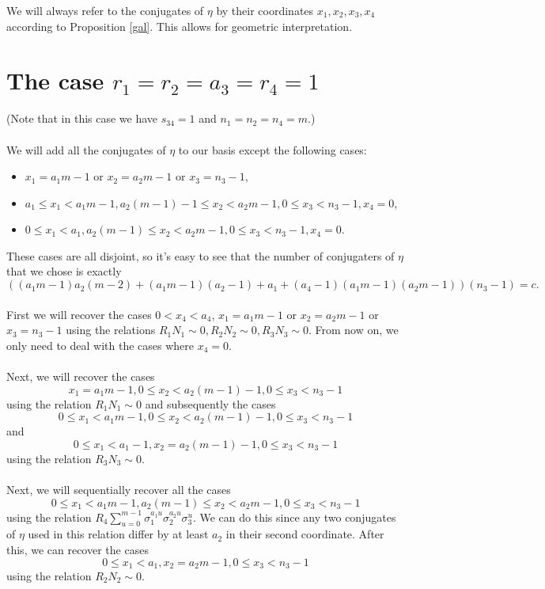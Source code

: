 \documentclass[12pt,a4paper]{article}
\begin{document}
We will always refer to the conjugates of $\eta$ by their coordinates $x_1,x_2,x_3,x_4$ according to Proposition \ref{gal}. This allows for geometric interpretation.

\section{The case $r_1=r_2=a_3=r_4=1$}
(Note that in this case we have $s_{34}=1$ and $n_1=n_2=n_4=m$.) %
\paragraph*{}
We will add all the conjugates of $\eta$ to our basis except the following cases:
\begin{itemize}
\item $x_1=a_1m-1$ or $x_2=a_2m-1$ or $x_3=n_3-1$,
\item $a_1\leq x_1 < a_1m-1, a_2(m-1)-1 \leq x_2 < a_2m-1, 0\leq x_3 < n_3-1, x_4=0$,
\item $0\leq x_1 < a_1, a_2(m-1) \leq x_2 < a_2m-1, 0\leq x_3 < n_3-1, x_4=0$.
\end{itemize}
These cases are all disjoint, so it's easy to see that the number of conjugaters of $\eta$ that we chose is exactly
$$((a_1m-1)a_2(m-2)+(a_1m-1)(a_2-1)+a_1+(a_4-1)(a_1m-1)(a_2m-1))\left(n_3-1\right)=c.$$
\paragraph*{}
First we will recover the cases $0<x_4<a_4$, $x_1=a_1m-1$ or $x_2=a_2m-1$ or $x_3=n_3-1$ using the relations $R_1N_1\sim 0, R_2N_2\sim 0, R_3N_3\sim 0$. From now on, we only need to deal with the cases where $x_4=0$.
\paragraph*{}
Next, we will recover the cases $$x_1=a_1m-1, 0\leq x_2 < a_2(m-1)-1, 0\leq x_3 <n_3-1$$ using the relation $R_1N_1\sim 0$ and subsequently the cases $$0\leq x_1 < a_1m-1, 0\leq x_2 < a_2(m-1)-1, 0\leq x_3 <n_3-1$$ and $$0\leq x_1 < a_1-1, x_2 = a_2(m-1)-1, 0\leq x_3 <n_3-1$$ using the relation $R_3N_3\sim 0$.
\paragraph*{}
Next, we will sequentially recover all the cases $$0\leq x_1 < a_1m-1, a_2(m-1)\leq x_2 < a_2m-1, 0\leq x_3 <n_3-1$$
using the relation $R_4\sum_{u=0}^{m-1}\sigma_1^{a_1u}\sigma_2^{a_2u}\sigma_3^u$. We can do this since any two conjugates of $\eta$ used in this relation differ by at least $a_2$ in their second coordinate. After this, we can recover the cases $$0\leq x_1 < a_1, x_2 = a_2m-1, 0\leq x_3 <n_3-1$$ using the relation $R_2N_2\sim 0$.
\end{document}
